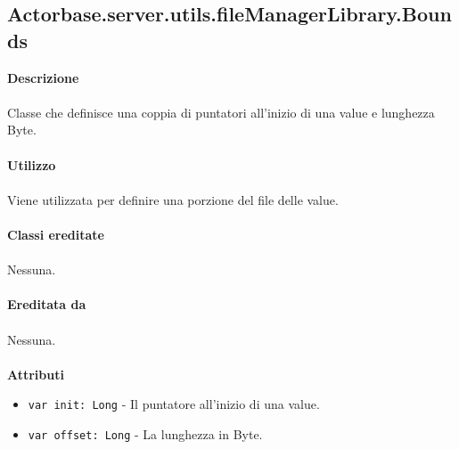 \documentclass[a4paper]{article}
\begin{document}
	\subsection{Actorbase.server.utils.fileManagerLibrary.Bounds}
		\textbf{Descrizione}
		\\ \\
		Classe che definisce una coppia di puntatori all'inizio di una value e lunghezza Byte.
		\\ \\
		\textbf{Utilizzo}
		\\ \\
		Viene utilizzata per definire una porzione del file delle value.
		\\ \\
		\textbf{Classi ereditate}
		\\ \\
		Nessuna.
		\\ \\
		\textbf{Ereditata da}
		\\ \\
		Nessuna.
		\\ \\
		\textbf{Attributi}
		\begin{itemize}
			\item \texttt{var init: Long} - Il puntatore all'inizio di una value.
			\item \texttt{var offset: Long} - La lunghezza in Byte.
		\end{itemize}	

	
	
\end{document}
